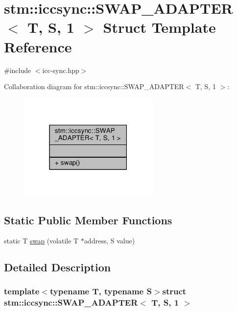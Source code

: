 \hypertarget{structstm_1_1iccsync_1_1SWAP__ADAPTER_3_01T_00_01S_00_011_01_4}{\section{stm\-:\-:iccsync\-:\-:S\-W\-A\-P\-\_\-\-A\-D\-A\-P\-T\-E\-R$<$ T, S, 1 $>$ Struct Template Reference}
\label{structstm_1_1iccsync_1_1SWAP__ADAPTER_3_01T_00_01S_00_011_01_4}
}


{\ttfamily \#include $<$icc-\/sync.\-hpp$>$}



Collaboration diagram for stm\-:\-:iccsync\-:\-:S\-W\-A\-P\-\_\-\-A\-D\-A\-P\-T\-E\-R$<$ T, S, 1 $>$\-:
\nopagebreak
\begin{figure}[H]
\begin{center}
\leavevmode
\includegraphics[width=198pt]{structstm_1_1iccsync_1_1SWAP__ADAPTER_3_01T_00_01S_00_011_01_4__coll__graph}
\end{center}
\end{figure}
\subsection*{Static Public Member Functions}
\begin{DoxyCompactItemize}
\item 
static T \hyperlink{structstm_1_1iccsync_1_1SWAP__ADAPTER_3_01T_00_01S_00_011_01_4_a54f68e08613e0923a83e1b9255112412}{swap} (volatile T $\ast$address, S value)
\end{DoxyCompactItemize}


\subsection{Detailed Description}
\subsubsection*{template$<$typename T, typename S$>$struct stm\-::iccsync\-::\-S\-W\-A\-P\-\_\-\-A\-D\-A\-P\-T\-E\-R$<$ T, S, 1 $>$}

